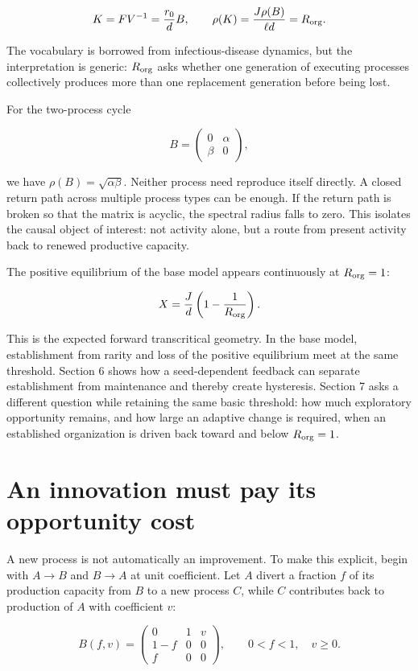 \documentclass[11pt,a4paper]{article}
\begin{document}
\[
K = FV^{-1} = \frac{r_0}{d}B, \qquad \rho(K) = \frac{J\rho(B)}{\ell d} = R_{\rm org}.
\]

The vocabulary is borrowed from infectious-disease dynamics, but the
interpretation is generic: \(R_{\rm org}\) asks whether one generation
of executing processes collectively produces more than one replacement
generation before being lost.

For the two-process cycle

\[
B = \begin{pmatrix} 0 & \alpha \\ \beta & 0 \end{pmatrix},
\]

we have \(\rho(B) = \sqrt{\alpha\beta}\). Neither process need reproduce
itself directly. A closed return path across multiple process types can
be enough. If the return path is broken so that the matrix is acyclic,
the spectral radius falls to zero. This isolates the causal object of
interest: not activity alone, but a route from present activity back to
renewed productive capacity.

The positive equilibrium of the base model appears continuously at
\(R_{\rm org} = 1\):

\[
X = \frac{J}{d}\left(1 - \frac{1}{R_{\rm org}}\right).
\]

This is the expected forward transcritical geometry. In the base model,
establishment from rarity and loss of the positive equilibrium meet at
the same threshold. Section 6 shows how a seed-dependent feedback can
separate establishment from maintenance and thereby create hysteresis.
Section 7 asks a different question while retaining the same basic
threshold: how much exploratory opportunity remains, and how large an
adaptive change is required, when an established organization is driven
back toward and below \(R_{\rm org}=1\).

\section{An innovation must pay its opportunity cost}

A new process is not automatically an improvement. To make this explicit, begin with $A\to B$ and $B\to A$ at unit coefficient. Let $A$ divert a fraction $f$ of its production capacity from $B$ to a new process $C$, while $C$ contributes back to production of $A$ with coefficient $v$:

\[
B(f,v)
=
\begin{pmatrix}
0 & 1 & v\\
1-f & 0 & 0\\
f & 0 & 0
\end{pmatrix},
\qquad
0<f<1,
\quad
v\geq0.
\]
\end{document}
